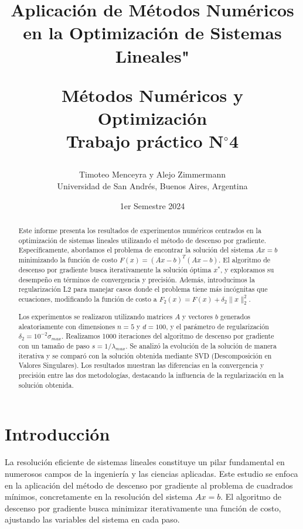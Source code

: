 \documentclass[12pt,a4]{article} %
\title{Aplicación de Métodos Numéricos en la Optimización de Sistemas Lineales"\\


\vspace{20mm}

 Métodos Numéricos y Optimización\\
 Trabajo práctico N$^{\circ}$4\\
}
\author{Timoteo Menceyra y Alejo Zimmermann\\ [2mm] %
\small Universidad de San Andrés, Buenos Aires, Argentina}
\date{1er Semestre 2024}
\begin{document}
\vspace{1cm} %



\maketitle


\begin{abstract}

Este informe presenta los resultados de experimentos numéricos centrados en la optimización de sistemas lineales utilizando el método de descenso por gradiente. Específicamente, abordamos el problema de encontrar la solución del sistema \(Ax = b\) minimizando la función de costo \(F(x) = (Ax - b)^T (Ax - b)\). El algoritmo de descenso por gradiente busca iterativamente la solución óptima \(x^*\), y exploramos su desempeño en términos de convergencia y precisión. Además, introducimos la regularización L2 para manejar casos donde el problema tiene más incógnitas que ecuaciones, modificando la función de costo a \(F_2(x) = F(x) + \delta_2 \|x\|_2^2\).

Los experimentos se realizaron utilizando matrices \(A\) y vectores \(b\) generados aleatoriamente con dimensiones \(n = 5\) y \(d = 100\), y el parámetro de regularización \(\delta_2 = 10^{-2} \sigma_{max}\). Realizamos 1000 iteraciones del algoritmo de descenso por gradiente con un tamaño de paso \(s = 1/\lambda_{max}\). Se analizó la evolución de la solución de manera iterativa y se comparó con la solución obtenida mediante SVD (Descomposición en Valores Singulares). Los resultados muestran las diferencias en la convergencia y precisión entre las dos metodologías, destacando la influencia de la regularización en la solución obtenida.

\vspace{2mm}
\end{abstract}


\raggedcolumns

\section{Introducción}

La resolución eficiente de sistemas lineales constituye un pilar fundamental en numerosos campos de la ingeniería y las ciencias aplicadas. Este estudio se enfoca en la aplicación del método de descenso por gradiente al problema de cuadrados mínimos, concretamente en la resolución del sistema $Ax = b$. El algoritmo de descenso por gradiente busca minimizar iterativamente una función de costo, ajustando las variables del sistema en cada paso.
\end{document}
